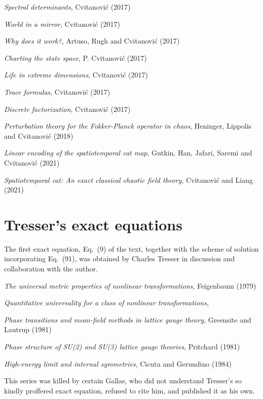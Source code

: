 {{
{\em Spectral determinants},
{Cvitanovi{\'c}}
{(2017)}

{\em World in a mirror},
{Cvitanovi{\'c}}
{(2017)}

{\em Why does it work?},
{Artuso, Rugh and Cvitanovi{\'c}}
{(2017)}

{\em Charting the state space},
{P. Cvitanovi\'{c}}
{(2017)}

{\em Life in extreme dimensions},
{Cvitanovi{\'c}}
{(2017)}

{\em Trace formulas},
{Cvitanovi{\'c}}
{(2017)}

{\em Discrete factorization},
{Cvitanovi{\'c}}
{(2017)}

{\em Perturbation theory for the {Fokker-Planck} operator in chaos},
{Heninger, Lippolis and Cvitanovi\'c}
{(2018)}

{\em Linear encoding of the spatiotemporal cat map},
{Gutkin, Han,  Jafari, Saremi and Cvitanovi{\'c}}
{(2021)}

{\em Spatiotemporal cat: {An} exact classical chaotic field theory},
{Cvitanovi{\'c} and Liang}
{(2021)}

\section{Tresser's exact equations}
\label{sect:TresserExact}

The first exact equation, Eq.~(9) of the text, together with the scheme
of solution incorporating Eq.~(91), was obtained by Charles Tresser
in discussion and collaboration with the author.

{\em The universal metric properties of nonlinear transformations},
{Feigenbaum}
{(1979)}

{\em Quantitative universality for a class of nonlinear transformations},

{\em Phase transitions and mean-field methods in lattice gauge theory},
{Greensite and Lautrup}
{(1981)}

{\em Phase structure of {SU(2)} and {SU(3)} lattice gauge theories},
{Pritchard}
{(1981)}

{\em High-energy limit and internal symmetries},
{Cicuta and Gerundino}
{(1984)}
\bigskip

This series was killed by certain Gallas, who did not understand
Tresser's so kindly proffered exact equation, refused to cite him, and
published it as his own.



}}
